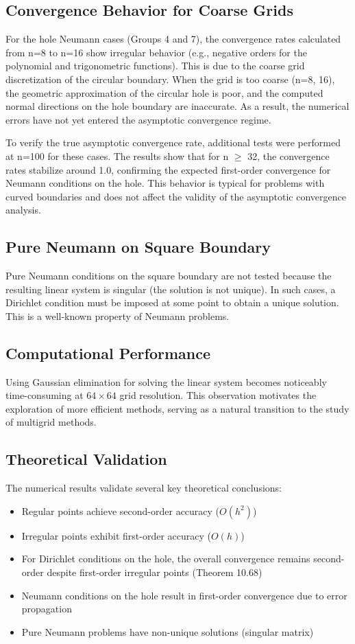 \documentclass[12pt,a4paper]{article}
\begin{document}
\subsection{Convergence Behavior for Coarse Grids}

For the hole Neumann cases (Groups 4 and 7), the convergence rates calculated from n=8 to n=16 show irregular behavior (e.g., negative orders for the polynomial and trigonometric functions). This is due to the coarse grid discretization of the circular boundary. When the grid is too coarse (n=8, 16), the geometric approximation of the circular hole is poor, and the computed normal directions on the hole boundary are inaccurate. As a result, the numerical errors have not yet entered the asymptotic convergence regime.

To verify the true asymptotic convergence rate, additional tests were performed at n=100 for these cases. The results show that for n $\ge$ 32, the convergence rates stabilize around 1.0, confirming the expected first-order convergence for Neumann conditions on the hole. This behavior is typical for problems with curved boundaries and does not affect the validity of the asymptotic convergence analysis.

\subsection{Pure Neumann on Square Boundary}
Pure Neumann conditions on the square boundary are not tested because the resulting linear system is singular (the solution is not unique). In such cases, a Dirichlet condition must be imposed at some point to obtain a unique solution. This is a well-known property of Neumann problems.

\subsection{Computational Performance}
Using Gaussian elimination for solving the linear system becomes noticeably time-consuming at \(64 \times 64\) grid resolution. This observation motivates the exploration of more efficient methods, serving as a natural transition to the study of multigrid methods.

\subsection{Theoretical Validation}
The numerical results validate several key theoretical conclusions:
\begin{itemize}
    \item Regular points achieve second-order accuracy (\(O(h^2)\))
    \item Irregular points exhibit first-order accuracy (\(O(h)\))
    \item For Dirichlet conditions on the hole, the overall convergence remains second-order despite first-order irregular points (Theorem 10.68)
    \item Neumann conditions on the hole result in first-order convergence due to error propagation
    \item Pure Neumann problems have non-unique solutions (singular matrix)
\end{itemize}
\end{document}
